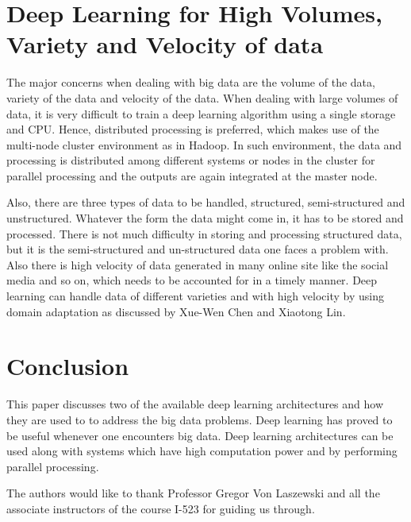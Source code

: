 \documentclass[sigconf]{acmart}
\begin{document}
\section{Deep Learning for High Volumes, Variety and Velocity of data}
The major concerns when dealing with big data are the volume of the data, variety of the data and velocity of the data. When dealing with large volumes of data, it is very difficult to train a deep learning algorithm using a single storage and CPU. Hence, distributed processing is preferred, which makes use of the multi-node cluster environment as in Hadoop. In such environment, the data and processing is distributed among different systems or nodes in the cluster for parallel processing and the outputs are again integrated at the master node.

Also, there are three types of data to be handled, structured, semi-structured and unstructured. Whatever the form the data might come in, it has to be stored and processed. There is not much difficulty in storing and processing structured data, but it is the semi-structured and un-structured data one faces a problem with. Also there is high velocity of data generated in many online site like the social media and so on, which needs to be accounted for in a timely manner. Deep learning can handle data of different varieties and with high velocity by using domain adaptation as discussed by Xue-Wen Chen and Xiaotong Lin.\cite{Chen2014}

\section{Conclusion}
This paper discusses two of the available deep learning architectures and how they are used to to address the big data problems. Deep learning has proved to be useful whenever one encounters big data. Deep learning architectures can be used along with systems which have high computation power and by performing parallel processing. 

\begin{acks}

  The authors would like to thank Professor Gregor Von Laszewski and all the associate instructors of the course I-523 for guiding us through.
\end{acks}



\end{document}
